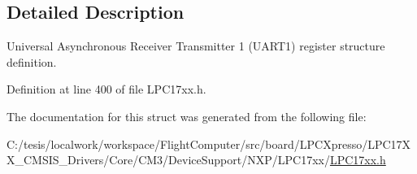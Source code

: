 \subsection{\-Detailed \-Description}
\-Universal \-Asynchronous \-Receiver \-Transmitter 1 (\-U\-A\-R\-T1) register structure definition. 

\-Definition at line 400 of file \-L\-P\-C17xx.\-h.



\-The documentation for this struct was generated from the following file\-:\begin{DoxyCompactItemize}
\item 
\-C\-:/tesis/localwork/workspace/\-Flight\-Computer/src/board/\-L\-P\-C\-Xpresso/\-L\-P\-C17\-X\-X\-\_\-\-C\-M\-S\-I\-S\-\_\-\-Drivers/\-Core/\-C\-M3/\-Device\-Support/\-N\-X\-P/\-L\-P\-C17xx/\hyperlink{_l_p_c17xx_8h}{\-L\-P\-C17xx.\-h}\end{DoxyCompactItemize}
